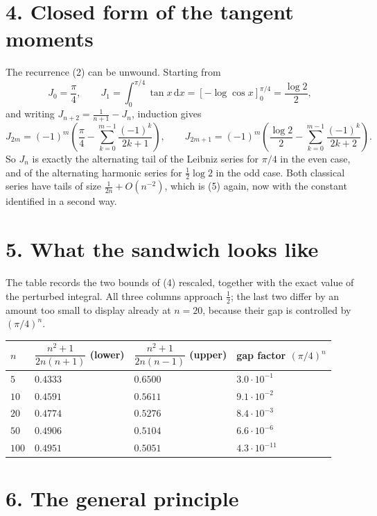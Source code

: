 \documentclass[12pt]{article}
\newcommand{\dd}{\,\mathrm{d}}
\newcommand{\Jn}{J_n}
\begin{document}
\section*{4. Closed form of the tangent moments}

The recurrence (2) can be unwound. Starting from
\[
J_0=\frac\pi4,
\qquad
J_1=\int_0^{\pi/4}\tan x\dd x=\left[-\log\cos x\right]_0^{\pi/4}
=\frac{\log2}{2},
\]
and writing \(J_{n+2}=\frac1{n+1}-\Jn\), induction gives
\[
J_{2m}=(-1)^m\left(\frac\pi4-\sum_{k=0}^{m-1}\frac{(-1)^k}{2k+1}\right),
\qquad
J_{2m+1}=(-1)^m\left(\frac{\log2}{2}-\sum_{k=0}^{m-1}\frac{(-1)^k}{2k+2}\right).
\tag{10}
\]
So \(\Jn\) is exactly the alternating tail of the Leibniz series for
\(\pi/4\) in the even case, and of the alternating harmonic series for
\(\frac12\log2\) in the odd case. Both classical series have tails of size
\(\frac1{2n}+O(n^{-2})\), which is (5) again, now with the constant
identified in a second way.

\section*{5. What the sandwich looks like}

The table records the two bounds of (4) rescaled, together with the exact
value of the perturbed integral. All three columns approach \(\frac12\);
the last two differ by an amount too small to display already at
\(n=20\), because their gap is controlled by \((\pi/4)^n\).

\begin{center}
\small
\renewcommand{\arraystretch}{1.35}
\begin{tabularx}{0.92\textwidth}{@{}lXXX@{}}
\toprule
\(n\)
& \(\dfrac{n^2+1}{2n(n+1)}\) (lower)
& \(\dfrac{n^2+1}{2n(n-1)}\) (upper)
& gap factor \((\pi/4)^n\) \\
\midrule
\(5\)   & \(0.4333\) & \(0.6500\) & \(3.0\cdot10^{-1}\) \\
\(10\)  & \(0.4591\) & \(0.5611\) & \(9.1\cdot10^{-2}\) \\
\(20\)  & \(0.4774\) & \(0.5276\) & \(8.4\cdot10^{-3}\) \\
\(50\)  & \(0.4906\) & \(0.5104\) & \(6.6\cdot10^{-6}\) \\
\(100\) & \(0.4951\) & \(0.5051\) & \(4.3\cdot10^{-11}\) \\
\bottomrule
\end{tabularx}
\end{center}

\section*{6. The general principle}
\end{document}
